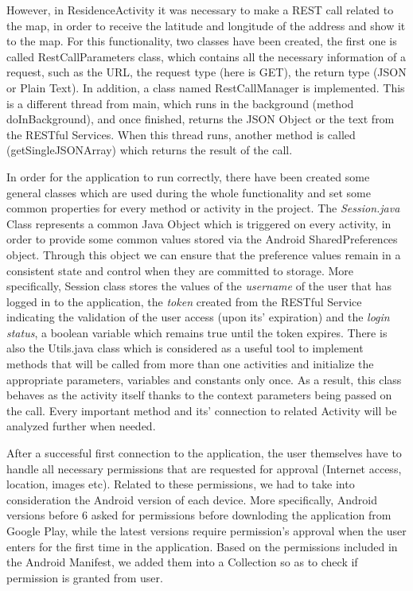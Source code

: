\documentclass[12pt]{article}
\begin{document}
	However, in ResidenceActivity it was necessary to make a REST call related to the map, in order to receive the latitude and longitude of the address and show it to the map. For this functionality, two classes have been created, the first one is called RestCallParameters class, which contains all the necessary information of a request, such as the URL, the request type (here is GET), the return type (JSON or Plain Text). In addition, a class named RestCallManager is implemented. This is a different thread from main, which runs in the background (method doInBackground), and once finished, returns the JSON Object or the text from the RESTful Services. When this thread runs, another method is called (getSingleJSONArray) which returns the result of the call.
	
	In order for the application to run correctly, there have been created some general classes which are used during the whole functionality and set some common properties for every method or activity in the project. The \textit{Session.java} Class represents a common Java Object which is triggered on every activity, in order to provide some common values stored via the Android SharedPreferences object. Through this object we can ensure that the preference values remain in a consistent state and control when they are committed to storage. More specifically, Session class stores the values of the \textit{username} of the user that has logged in to the application, the \textit{token} created from the RESTful Service indicating the validation of the user access (upon its' expiration) and the \textit{login status}, a boolean variable which remains true until the token expires. There is also the Utils.java class which is considered as a useful tool to implement methods that will be called from more than one activities and initialize the appropriate parameters, variables and constants only once. As a result, this class behaves as the activity itself thanks to the context parameters being passed on the call. Every important method and its' connection to related Activity will be analyzed further when needed. 
	
	After a successful first connection to the application, the user themselves have to handle all necessary permissions that are requested for approval (Internet access, location, images etc). Related to these permissions, we had to take into consideration the Android version of each device. More specifically, Android versions before 6 asked for permissions before downloding the application from Google Play, while the latest versions require permission's approval when the user enters for the first time in the application. Based on the permissions included in the Android Manifest, we added them into a Collection so as to check if permission is granted from user.
	
\end{document}
